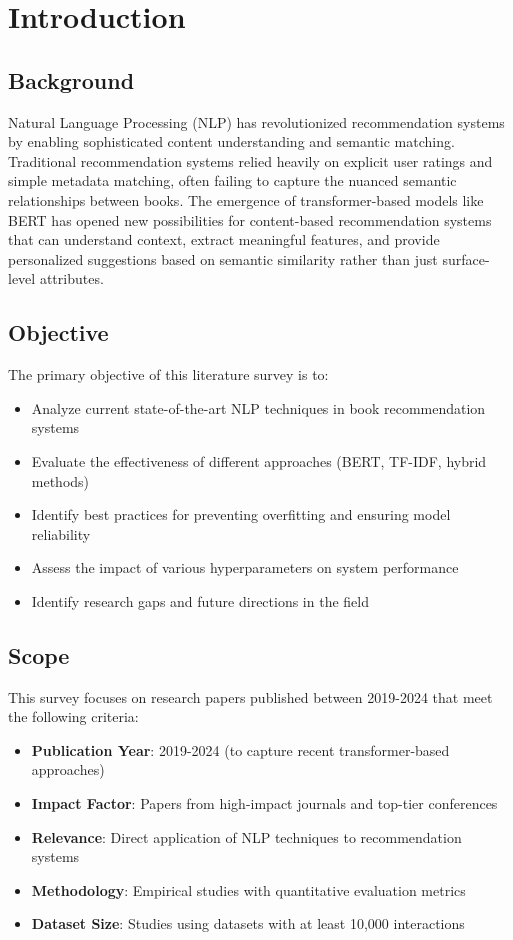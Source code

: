 \documentclass[12pt,a4paper]{article}
\begin{document}
\listoftables
\newpage


\section{Introduction}

\subsection{Background}
Natural Language Processing (NLP) has revolutionized recommendation systems by enabling sophisticated content understanding and semantic matching. Traditional recommendation systems relied heavily on explicit user ratings and simple metadata matching, often failing to capture the nuanced semantic relationships between books. The emergence of transformer-based models like BERT has opened new possibilities for content-based recommendation systems that can understand context, extract meaningful features, and provide personalized suggestions based on semantic similarity rather than just surface-level attributes.

\subsection{Objective}
The primary objective of this literature survey is to:
\begin{itemize}
    \item Analyze current state-of-the-art NLP techniques in book recommendation systems
    \item Evaluate the effectiveness of different approaches (BERT, TF-IDF, hybrid methods)
    \item Identify best practices for preventing overfitting and ensuring model reliability
    \item Assess the impact of various hyperparameters on system performance
    \item Identify research gaps and future directions in the field
\end{itemize}

\subsection{Scope}
This survey focuses on research papers published between 2019-2024 that meet the following criteria:
\begin{itemize}
    \item \textbf{Publication Year}: 2019-2024 (to capture recent transformer-based approaches)
    \item \textbf{Impact Factor}: Papers from high-impact journals and top-tier conferences
    \item \textbf{Relevance}: Direct application of NLP techniques to recommendation systems
    \item \textbf{Methodology}: Empirical studies with quantitative evaluation metrics
    \item \textbf{Dataset Size}: Studies using datasets with at least 10,000 interactions
\end{itemize}
\end{document}
